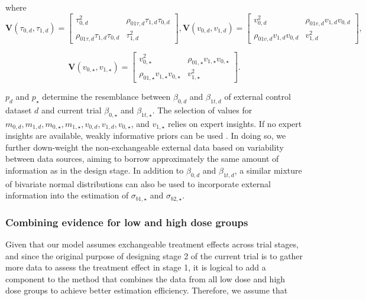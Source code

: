 where $$\boldsymbol{V}(\tau_{0,d}, \tau_{1,d}) = \begin{bmatrix} \tau_{0,d}^2 & \rho_{01\tau,d}\tau_{1,d}\tau_{0,d}\\ \rho_{01\tau,d}\tau_{1,d}\tau_{0,d} & \tau_{1,d}^2\end{bmatrix}, \boldsymbol{V}(v_{0,d}, v_{1,d}) = \begin{bmatrix} v_{0,d}^2 & \rho_{01v,d}v_{1,d}v_{0,d}\\ \rho_{01v,d}v_{1,d}v_{0,d} & v_{1,d}^2\end{bmatrix},$$

$$\boldsymbol{V}(v_{0,\star}, v_{1,\star}) = \begin{bmatrix} v_{0,\star}^2 & \rho_{01,\star}v_{1,\star}v_{0,\star}\\ \rho_{01,\star}v_{1,\star}v_{0,\star} & v_{1,\star}^2\end{bmatrix}.$$

$p_d$ and $p_\star$ determine the resemblance between $\beta_{0,d}$ and $\beta_{1t,d}$ of external control dataset $d$ and current trial $\beta_{0, \star}$ and $\beta_{1t,\star}$. The selection of values for $m_{0,d}, m_{1,d}, m_{0,\star}, m_{1,\star}, v_{0,d}, v_{1,d}, v_{0,\star}$, and $v_{1,\star}$ relies on expert insights. If no expert insights are available, weakly informative priors can be used \citep{kass1995reference}.
In doing so, we further down-weight the non-exchangeable external data based on variability between data sources, aiming to borrow approximately the same amount of information as in the design stage. In addition to $\beta_{0,d}$ and $\beta_{1t,d}$, a similar mixture of bivariate normal distributions can also be used to incorporate external information into the estimation of $\sigma_{b1,\star}$ and $\sigma_{b2,\star}$.

\subsubsection{Combining evidence for low and high dose groups}
Given that our model assumes exchangeable treatment effects across trial stages, and since the original purpose of designing stage 2 of the current trial is to gather more data to assess the treatment effect in stage 1, it is logical to add a component to the method that combines the data from all low dose and high dose groups to achieve better estimation efficiency. Therefore, we assume that 

